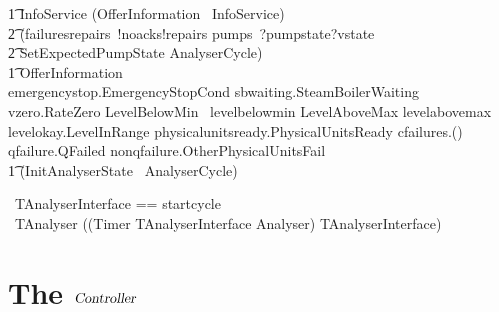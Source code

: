 \documentclass{report} %
\begin{document}
\begin{circus}
    \t1 InfoService \circdef (OfferInformation \circseq\ InfoService) \extchoice \\
            \t2 (failuresrepairs~!noacks!repairs \then pumps~?pumpstate?vstate \then \\
            \t2 \lschexpract SetExpectedPumpState \rschexpract \circseq AnalyserCycle) \\ %
    \t1 OfferInformation \circdef \\
            emergencystop.EmergencyStopCond \then \Skip
            \extchoice  sbwaiting.SteamBoilerWaiting \then \Skip
            \extchoice  vzero.RateZero \then \Skip
            \extchoice  \lcircguard LevelBelowMin \rcircguard \circguard\ levelbelowmin \then \Skip
            \extchoice \lcircguard LevelAboveMax \rcircguard \circguard levelabovemax \then \Skip
            \extchoice levelokay.LevelInRange \then \Skip
            \extchoice physicalunitsready.PhysicalUnitsReady \then \Skip
            \extchoice cfailures.(\false) \then \Skip
            \extchoice qfailure.QFailed \then \Skip
            \extchoice  nonqfailure.OtherPhysicalUnitsFail \then \Skip \\
    \t1 \circspot (\lschexpract InitAnalyserState \rschexpract \circseq\ AnalyserCycle) \\
    \circend
\end{circus}

\begin{circus}
    \circchannelset\ TAnalyserInterface == \lchanset startcycle \rchanset \\
    \circprocess\ TAnalyser \circdef
    ((Timer \lpar TAnalyserInterface \rpar Analyser) \circhide TAnalyserInterface)
\end{circus}
\chapter{The $\mathsl{Controller}$}
\end{document}
